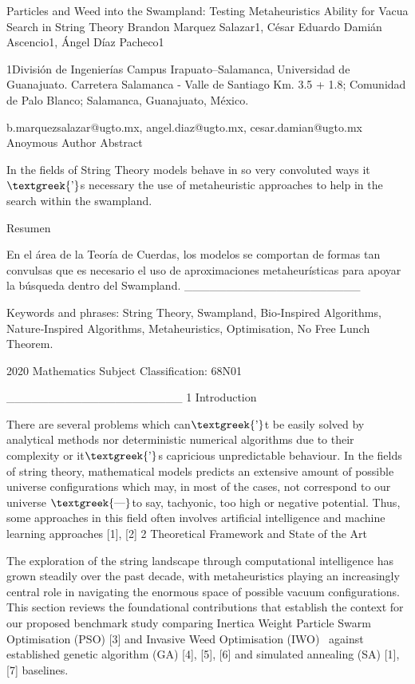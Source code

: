 \documentclass{article}
\author{Brandon Marquez Salazar}
\date{2026-07-07}
\begin{document}
\clearpage

Particles and Weed into the Swampland: Testing Metaheuristics Ability for Vacua Search in String Theory
Brandon Marquez Salazar1, César Eduardo Damián Ascencio1, Ángel Díaz Pacheco1

1División de Ingenierías Campus Irapuato–Salamanca, Universidad de Guanajuato. Carretera Salamanca - Valle de Santiago
Km. 3.5 + 1.8; Comunidad de Palo Blanco; Salamanca, Guanajuato, México.

b.marquezsalazar@ugto.mx, angel.diaz@ugto.mx, cesar.damian@ugto.mx
Anoymous Author
Abstract

In the fields of String Theory models behave in so very convoluted ways it$\text{\textgreek{’}}$s necessary the use of
metaheuristic approaches to help in the search within the swampland.

Resumen

En el área de la Teoría de Cuerdas, los modelos se comportan de formas tan convulsas que es necesario el uso de
aproximaciones metaheurísticas para apoyar la búsqueda dentro del Swampland.
\_\_\_\_\_\_\_\_\_\_\_\_\_\_\_\_\_\_\_\_\_

Keywords and phrases: String Theory, Swampland, Bio‑Inspired Algorithms, Nature‑Inspired Algorithms, Metaheuristics,
Optimisation, No Free Lunch Theorem.

%
2020 Mathematics Subject Classification: 68N01 

\_\_\_\_\_\_\_\_\_\_\_\_\_\_\_\_\_\_\_\_\_
1 Introduction

There are several problems which can$\text{\textgreek{’}}$t be easily solved by analytical methods nor deterministic
numerical algorithms due to their complexity or it$\text{\textgreek{’}}$s capricious unpredictable behaviour. In the
fields of string theory, mathematical models predicts an extensive amount of possible universe configurations which
may, in most of the cases, not correspond to our universe $\text{\textgreek{—}}$to say, tachyonic, too high or negative
potential. Thus, some approaches in this field often involves artificial intelligence and machine learning approaches
[1], [2]
2 Theoretical Framework and State of the Art

The exploration of the string landscape through computational intelligence has grown steadily over the past decade, with
metaheuristics playing an increasingly central role in navigating the enormous space of possible vacuum configurations.
This section reviews the foundational contributions that establish the context for our proposed benchmark study
comparing Inertica Weight Particle Swarm Optimisation (PSO) [3] and Invasive Weed Optimisation (IWO) \ against
established genetic algorithm (GA) [4], [5], [6] and simulated annealing (SA) [1], [7] baselines.
\end{document}
